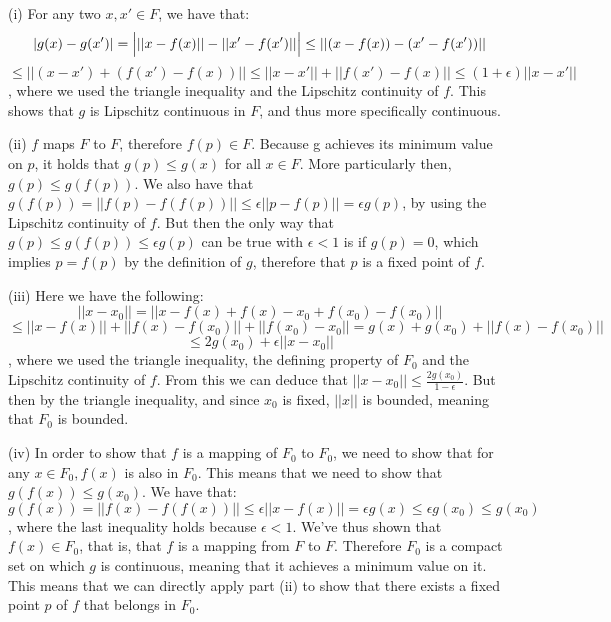\begin{solution}

    (i) For any two $x, x' \in F$, we have that:
    $$\lvert g(x) - g(x') \rvert = \Bigl\lvert \lvert \lvert x - f(x) \rvert \rvert - \lvert \lvert x' - f(x') \rvert \rvert \Bigr \rvert \leq \lvert \lvert (x - f(x)) - (x' - f(x')) \rvert \rvert$$
    $$\leq \lvert \lvert (x - x') + (f(x') - f(x)) \rvert \rvert \leq \lvert \lvert x - x' \rvert \rvert + \lvert \lvert f(x') - f(x) \rvert \rvert \leq (1 + \epsilon)\lvert \lvert x - x' \rvert \rvert$$,
    where we used the triangle inequality and the Lipschitz continuity of $f$.
    This shows that $g$ is Lipschitz continuous in $F$, and thus more specifically continuous.

    (ii) $f$ maps $F$ to $F$, therefore $f(p) \in F$.
    Because g achieves its minimum value on $p$, it holds that $g(p) \leq g(x)$ for all $x \in F$.
    More particularly then, $g(p) \leq g(f(p))$.
    We also have that $g(f(p)) = \lvert \lvert f(p) - f(f(p)) \rvert \rvert \leq \epsilon \lvert \lvert p - f(p) \rvert \rvert = \epsilon g(p)$, by using the Lipschitz continuity of $f$.
    But then the only way that $g(p) \leq g(f(p)) \leq \epsilon g(p)$ can be true with $\epsilon < 1$ is if $g(p) = 0$, which implies $p = f(p)$ by the definition of $g$, therefore that $p$ is a fixed point of $f$.

    (iii) Here we have the following:
    $$\lvert \lvert x - x_0 \rvert \rvert = \lvert \lvert x - f(x) + f(x) - x_0 + f(x_0) - f(x_0) \rvert \rvert$$
    $$\leq \lvert \lvert x - f(x) \rvert \rvert + \lvert \lvert f(x) - f(x_0) \rvert \rvert + \lvert \lvert f(x_0) - x_0 \rvert \rvert = g(x) + g(x_0) + \lvert \lvert f(x) - f(x_0) \rvert \rvert$$
    $$\leq 2g(x_0) + \epsilon \lvert \lvert x - x_0 \rvert \rvert$$,
    where we used the triangle inequality, the defining property of $F_0$ and the Lipschitz continuity of $f$.
    From this we can deduce that $\lvert \lvert x - x_0 \rvert \rvert \leq \frac{2g(x_0)}{1 - \epsilon}$.
    But then by the triangle inequality, and since $x_0$ is fixed, $\lvert \lvert x \rvert \rvert$ is bounded, meaning that $F_0$ is bounded.

    (iv) In order to show that $f$ is a mapping of $F_0$ to $F_0$, we need to show that for any $x \in F_0, f(x)$ is also in $F_0$.
    This means that we need to show that $g(f(x)) \leq g(x_0)$.
    We have that:
    $$g(f(x)) = \lvert \lvert f(x) - f(f(x)) \rvert \rvert \leq \epsilon \lvert \lvert x - f(x) \rvert \rvert = \epsilon g(x) \leq \epsilon g(x_0) \leq g(x_0)$$,
    where the last inequality holds because $\epsilon < 1$.
    We've thus shown that $f(x) \in F_0$, that is, that $f$ is a mapping from $F$ to $F$.
    Therefore $F_0$ is a compact set on which $g$ is continuous, meaning that it achieves a minimum value on it.
    This means that we can directly apply part (ii) to show that there exists a fixed point $p$ of $f$ that belongs in $F_0$.


\end{solution}
